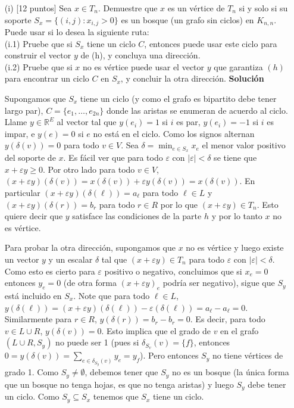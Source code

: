 \documentclass{article}
\newcommand{\RR}{\mathbb R}
\theoremstyle{plain}
\theoremstyle{definition}
\theoremstyle{Azul}
\begin{document}
\begin{enumerate}
\item[(i)] [12 puntos] Sea $x\in T_n$. Demuestre que $x$ es un vértice de $T_n$ si y solo si su soporte $S_x=\{(i,j)\colon x_{i,j}>0\}$ es un bosque (un grafo sin ciclos) en $K_{n,n}$. Puede usar si lo desea la siguiente ruta:\\
(i.1) Pruebe que si $S_x$ tiene un ciclo $C$, entonces puede usar este ciclo para construir el vector $y$ de (h), y concluya una dirección.\\
(i.2) Pruebe que si $x$ no es vértice puede usar el vector $y$ que garantiza $(h)$ para encontrar un ciclo $C$ en $S_x$, y concluir la otra dirección.
\textbf{Solución}

Supongamos que $S_x$ tiene un ciclo (y como el grafo es bipartito debe tener largo par), $C=\{e_1,\dots, e_{2n}\}$ donde las aristas se enumeran de acuerdo al ciclo. Llame $y\in \RR^E$ al vector tal que $y(e_i)=1$ si $i$ es par, $y(e_i)=-1$ si $i$ es impar, e $y(e)=0$ si $e$ no está en el ciclo. Como los signos alternan $y(\delta(v))=0$ para todo $v\in V$.
Sea $\delta=\min_{e\in S_x}x_e$ el menor valor positivo del soporte de $x$. Es fácil ver que para todo $\varepsilon$ con $|\varepsilon|<\delta$ se tiene que $x+\varepsilon y\geq 0$. Por otro lado para todo $v\in V$, $(x+\varepsilon y)(\delta(v))= x(\delta(v))+\varepsilon y(\delta(v))=x(\delta(v))$. En particular $(x+\varepsilon y)(\delta(\ell))=a_\ell$ para todo $\ell\in L$ y $(x+\varepsilon y)(\delta(r))=b_r$ para todo $r\in R$ por lo que $(x+\varepsilon y)\in T_n$. Esto quiere decir que $y$ satisface las condiciones de la parte $h$ y por lo tanto $x$ no es vértice.

Para probar la otra dirección, supongamos que $x$ no es vértice y luego existe un vector $y$ y un escalar $\delta$ tal que $(x+\varepsilon y) \in T_n$ para todo $\varepsilon$ con $|\varepsilon|<\delta$. Como esto es cierto para $\varepsilon$ positivo o negativo, concluimos que si $x_e=0$ entonces $y_e=0$ (de otra forma $(x+\varepsilon y)_e$ podría ser negativo), sigue que $S_y$ está incluido en $S_x$. Note que para todo $\ell\in L$, $y(\delta(\ell))=(x+\varepsilon y)(\delta(\ell))-\varepsilon(\delta(\ell))=a_\ell - a_\ell =0$. Similarmente para $r\in R$, $y(\delta(r))=b_r-b_r=0$. Es decir, para todo $v\in L\cup R$, $y(\delta(v))=0$. Esto implica que el grado de $v$ en el grafo $(L\cup R, S_y)$ no puede ser 1 (pues si $\delta_{S_v}(v)=\{f\}$, entonces $0=y(\delta(v))=\sum_{e\in \delta_{S_y}(v)}y_e= y_f$). Pero entonces $S_y$ no tiene vértices de grado 1.  Como $S_y\neq \emptyset$, debemos tener que $S_y$ no es un bosque (la única forma que un bosque no tenga hojas, es que no tenga aristas) y luego $S_y$ debe tener un ciclo. Como $S_y\subseteq S_x$ tenemos que $S_x$ tiene un ciclo.
\end{enumerate}
\end{document}
